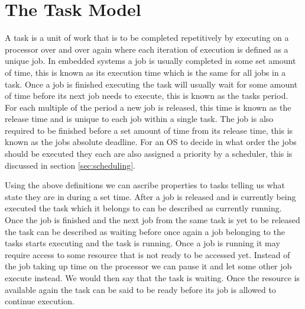 \documentclass{kththesis}
\begin{document}
\section{The Task Model}

A task is a unit of work that is to be completed repetitively by executing on a processor over and
over again where each iteration of execution is defined as a unique job. In embedded systems a job
is usually completed in some set amount of time, this is known as its execution time which is the
same for all jobs in a task. Once a job is finished executing the task will usually wait for some
amount of time before its next job needs to execute, this is known as the tasks period. For each
multiple of the period a new job is released, this time is known as the release time and is unique
to each job within a single task.  The job is also required to be finished before a set amount of
time from its release time, this is known as the jobs absolute deadline.  For an
OS to decide in what order the jobs should be executed they each
are also assigned a priority by a scheduler, this is discussed in section \ref{sec:scheduling}.

Using the above definitions we can ascribe properties to tasks telling us what state they are in
during a set time. After a job is released and is currently being executed the task which it belongs
to can be described as currently running. Once the job is finished and the next job from the same
task is yet to be released the task can be described as waiting before once again a job belonging to
the tasks starts executing and the task is running. Once a job is running it may require access to
some resource that is not ready to be accessed yet. Instead of the job taking up time on the
processor we can pause it and let some other job execute instead. We would then say that the task is
waiting. Once the resource is available again the task can be said to be ready before its job is
allowed to continue execution.
\end{document}
